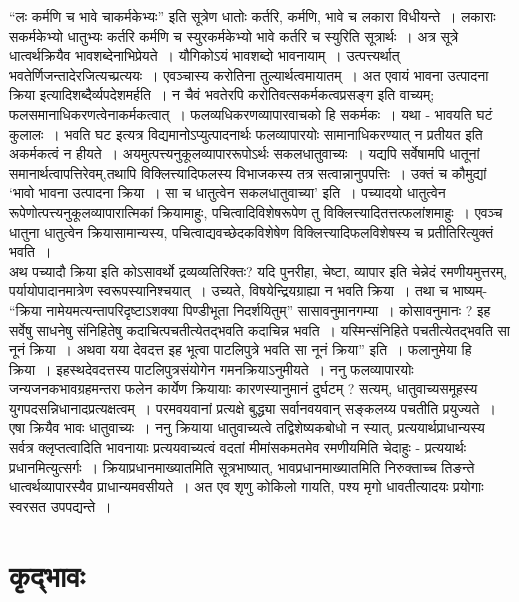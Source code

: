 {“लः कर्मणि च भावे चाकर्मकेभ्यः” इति सूत्रेण धातोः कर्तरि, कर्मणि, भावे च लकारा विधीयन्ते~। लकाराः सकर्मकेभ्यो धातुभ्यः कर्तरि कर्मणि च स्युरकर्मकेभ्यो भावे कर्तरि च स्युरिति सूत्रार्थः~। अत्र सूत्रे धात्वर्थक्रियैव भावशब्देनाभिप्रेयते~। यौगिकोऽयं भावशब्दो भावनायाम्~। उत्पत्त्यर्थात् भवतेर्णिजन्तादेरजित्यच्प्रत्ययः~। एवञ्चास्य करोतिना तुल्यार्थत्वमायातम्~। अत एवायं भावना उत्पादना क्रिया इत्यादिशब्दैर्व्यपदेशमर्हति~। न चैवं भवतेरपि करोतिवत्सकर्मकत्वप्रसङ्ग इति वाच्यम्; फलसमानाधिकरणत्वेनाकर्मकत्वात्~। फलव्यधिकरणव्यापारवाचको हि सकर्मकः~। यथा - भावयति घटं कुलालः~। भवति घट इत्यत्र विद्यमानोऽप्युत्पादनार्थः फलव्यापारयोः सामानाधिकरण्यात् न प्रतीयत इति अकर्मकत्वं न हीयते~। अयमुत्पत्त्यनुकूलव्यापाररूपोऽर्थः सकलधातुवाच्यः~। यद्यपि सर्वेषामपि धातूनां समानार्थत्वापत्तिरेवम्,\break तथापि विक्लित्त्यादिफलस्य विभाजकस्य तत्र सत्वान्नानुपपत्तिः~। उक्तं च कौमुद्यां ‘भावो भावना उत्पादना क्रिया~। सा च धातुत्वेन सकलधातुवाच्या’ इति~। पच्यादयो धातुत्वेन रूपेणोत्पत्त्यनुकूलव्यापारात्मिकां क्रियामाहुः, पचित्वादिविशेषरूपेण तु विक्लित्त्यादितत्तत्फलांशमाहुः~। एवञ्च धातुना धातुत्वेन क्रियासामान्यस्य, पचित्वाद्यवच्छेदकविशेषेण विक्लित्त्यादिफलविशेषस्य च प्रतीतिरित्युक्तं भवति~। 
~\\[0.1cm]
अथ पच्यादौ क्रिया इति कोऽसावर्थो द्रव्यव्यतिरिक्तः? यदि पुनरीहा, चेष्टा, व्यापार इति चेन्नेदं रमणीयमुत्तरम्, पर्यायोपादानमात्रेण स्वरूपस्यानिश्चयात्~। उच्यते, विषयेन्द्रियग्राह्या न भवति क्रिया~। तथा च भाष्यम्-  “क्रिया नामेयमत्यन्तापरिदृष्टाऽशक्या पिण्डीभूता निदर्शयितुम्” सासावनुमानगम्या~। कोसावनुमानः ? इह सर्वेषु साधनेषु संनिहितेषु कदाचित्पचतीत्येतद्भवति कदाचिन्न भवति~। यस्मिन्संनिहिते पचतीत्येतद्भवति सा नूनं क्रिया~। अथवा यया देवदत्त इह भूत्वा पाटलिपुत्रे भवति सा नूनं क्रिया” इति~। फलानुमेया हि क्रिया~। इहस्थदेवदत्तस्य पाटलिपुत्रसंयोगेन गमनक्रियाऽनुमीयते~। ननु फलव्यापारयोः जन्यजनकभावग्रहमन्तरा फलेन कार्येण क्रियायाः कारणस्यानुमानं दुर्घटम् ? सत्यम्, धातुवाच्यसमूहस्य युगपदसन्निधानादप्रत्यक्षत्वम्~। परमवयवानां प्रत्यक्षे बुद्ध्या सर्वानवयवान् सङ्कलय्य पचतीति प्रयुज्यते~। एषा क्रियैव भावः धातुवाच्यः~। ननु क्रियाया धातुवाच्यत्वे तद्विशेष्यकबोधो न स्यात्, प्रत्ययार्थप्राधान्यस्य सर्वत्र क्लृप्तत्वादिति भावनायाः प्रत्ययवाच्यत्वं वदतां मीमांसकमतमेव रमणीयमिति चेदाहुः - प्रत्ययार्थः प्रधानमित्युत्सर्गः~। क्रियाप्रधानमाख्यातमिति  सूत्रभाष्यात्, भावप्रधानमाख्यातमिति निरुक्ताच्च तिङन्ते धात्वर्थव्यापारस्यैव प्राधान्यमवसीयते~। अत एव शृणु कोकिलो गायति, पश्य मृगो धावतीत्यादयः प्रयोगाः स्वरसत उपपद्यन्ते~। 

\section*{कृद्भावः} 

}
